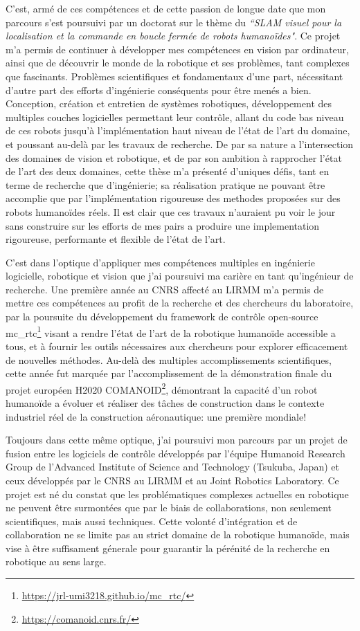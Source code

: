 \documentclass[11pt, a4paper]{awesome-cv}
\begin{document}
\begin{cvletter}
  C'est, armé de ces compétences et de cette passion de longue date que mon parcours s'est poursuivi par un doctorat sur le thème du \emph{``SLAM visuel pour la localisation et la commande en boucle fermée de robots humanoïdes"}. Ce projet m'a permis de continuer à développer mes compétences en vision par ordinateur, ainsi que de découvrir le monde de la robotique et ses problèmes, tant complexes que fascinants. Problèmes scientifiques et fondamentaux d'une part, nécessitant d'autre part des efforts d'ingénierie conséquents pour être menés a bien. Conception, création et entretien de systèmes robotiques, développement des multiples couches logicielles permettant leur contrôle, allant du code bas niveau de ces robots jusqu'à l'implémentation haut niveau de l'état de l'art du domaine, et poussant au-delà par les travaux de recherche. De par sa nature a l'intersection des domaines de vision et robotique, et de par son ambition à rapprocher l'état de l'art des deux domaines, cette thèse m'a présenté d'uniques défis, tant en terme de recherche que d'ingénierie; sa réalisation pratique ne pouvant être accomplie que par l'implémentation rigoureuse des methodes proposées sur des robots humanoïdes réels. Il est clair que ces travaux n'auraient pu voir le jour sans construire sur les efforts de mes pairs a produire une implementation rigoureuse, performante et flexible de l'état de l'art.

  C'est dans l'optique d'appliquer mes compétences multiples en ingénierie logicielle, robotique et vision que j'ai poursuivi ma carière en tant qu'ingénieur de recherche. Une première année au CNRS affecté au LIRMM m'a permis de mettre ces compétences au profit de la recherche et des chercheurs du laboratoire, par la poursuite du développement du framework de contrôle open-source mc\_rtc\footnote{\url{https://jrl-umi3218.github.io/mc_rtc/}} visant a rendre l'état de l'art de la robotique humanoïde accessible a tous, et à fournir les outils nécessaires aux chercheurs pour explorer efficacement de nouvelles méthodes. Au-delà des multiples accomplissements scientifiques, cette année fut marquée par l'accomplissement de la démonstration finale du projet européen H2020 COMANOID\footnote{\url{https://comanoid.cnrs.fr/}}, démontrant la capacité d'un robot humanoïde a évoluer et réaliser des tâches de construction dans le contexte industriel réel de la construction aéronautique: une première mondiale!

  Toujours dans cette même optique, j'ai poursuivi mon parcours par un projet de fusion entre les logiciels de contrôle développés par l'équipe Humanoid Research Group de l'Advanced Institute of Science and Technology (Tsukuba, Japan) et ceux développés par le CNRS au LIRMM et au Joint Robotics Laboratory. Ce projet est né du constat que les problématiques complexes actuelles en robotique ne peuvent être surmontées que par le biais de collaborations, non seulement scientifiques, mais aussi techniques. Cette volonté d'intégration et de collaboration ne se limite pas au strict domaine de la robotique humanoïde, mais vise à être suffisament génerale pour guarantir la pérénité de la recherche en robotique au sens large.


\end{cvletter}
\end{document}
